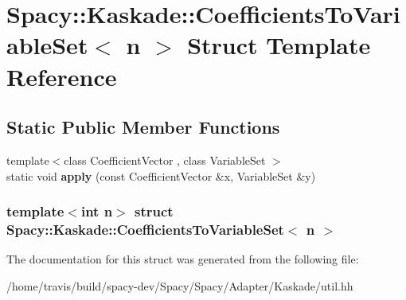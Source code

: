 \hypertarget{structSpacy_1_1Kaskade_1_1CoefficientsToVariableSet}{\section{\-Spacy\-:\-:\-Kaskade\-:\-:\-Coefficients\-To\-Variable\-Set$<$ n $>$ \-Struct \-Template \-Reference}
\label{structSpacy_1_1Kaskade_1_1CoefficientsToVariableSet}
}
\subsection*{\-Static \-Public \-Member \-Functions}
\begin{DoxyCompactItemize}
\item 
\hypertarget{structSpacy_1_1Kaskade_1_1CoefficientsToVariableSet_ae781a8e6bdd675c290d92b32c8f365a2}{{\footnotesize template$<$class Coefficient\-Vector , class Variable\-Set $>$ }\\static void {\bfseries apply} (const \-Coefficient\-Vector \&x, \-Variable\-Set \&y)}\label{structSpacy_1_1Kaskade_1_1CoefficientsToVariableSet_ae781a8e6bdd675c290d92b32c8f365a2}

\end{DoxyCompactItemize}
\subsubsection*{template$<$int n$>$ struct Spacy\-::\-Kaskade\-::\-Coefficients\-To\-Variable\-Set$<$ n $>$}



\-The documentation for this struct was generated from the following file\-:\begin{DoxyCompactItemize}
\item 
/home/travis/build/spacy-\/dev/\-Spacy/\-Spacy/\-Adapter/\-Kaskade/util.\-hh\end{DoxyCompactItemize}
